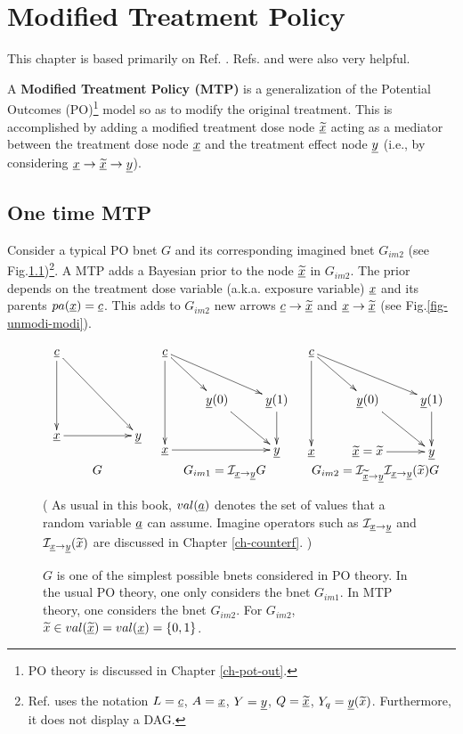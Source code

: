 \chapter{Modified Treatment Policy}
\label{ch-modi-treat}

This chapter is based
primarily on Ref. \cite{han-rot-2013}.
Refs.
\cite{hernan-book}
and \cite{khstats-mtp}
were also very helpful.


A {\bf Modified Treatment Policy (MTP)}
is a generalization
of the Potential
Outcomes (PO)\footnote{PO theory
is discussed in Chapter
 \ref{ch-pot-out}.} model
so as to
modify the original treatment.
This is accomplished
by adding a modified treatment
dose node $\ul{\tilx}$
acting as a mediator
between the treatment dose node 
$\rvx$ and the treatment effect node $\rvy$ (i.e., by considering
$\rvx\rarrow\ul{\tilx}\rarrow \rvy$).

\section{One time MTP}
Consider a typical PO bnet $G$
and its corresponding imagined bnet $G_{im2}$ (see Fig.\ref{fig-modi-po})\footnote{ Ref.\cite{han-rot-2013} uses the
notation $L = \rvc$,
$A = \rvx$, $Y=\rvy$, $Q=\ul{\tilx}$,
$Y_q=\rvy(\tilx)$. Furthermore, it does not 
display a DAG.
}.
A MTP adds a Bayesian prior to the
 node $\ul{\tilx}$ in $G_{im2}$.
The prior depends on the treatment
dose variable (a.k.a. exposure variable) $\rvx$ and its parents $pa(\rvx)=\rvc$.
This adds 
to $G_{im2}$  new arrows $\rvc\rarrow\ul{\tilx}$
and $\rvx\rarrow \ul{\tilx}$ (see Fig.\ref{fig-unmodi-modi}).


\begin{figure}[h!]
$$
\begin{array}{ccc}
\xymatrix{
\rvc
\ar[dd]\ar[ddrr]
\\
\\
\rvx \ar[rr]
&
&\rvy
}
&
\xymatrix{
\rvc
\ar[dd]\ar[dr] \ar[drr]
\\
& \rvy(0)\ar[dr]
&\rvy(1)\ar[d]
\\
\rvx\ar[rr]
&
&\rvy
}
&
\xymatrix{
\rvc
\ar[dd]\ar[dr] \ar[drr]
\\
& \rvy(0)\ar[dr]
&\rvy(1)\ar[d]
\\
\rvx
&\ul{\tilx}=\tilx\ar[r]
&\rvy
}
\\
G
&G_{im1} =\cali_{\rvx\rarrow\rvy} G
& G_{im2}=\cali_{\ul{\tilx}\rarrow\rvy}\cali_{\rvx\rarrow\rvy}(\tilx)G
\end{array}
$$
\caption{$G$ is one of the
simplest possible bnets considered in  PO theory.
In the usual PO theory,
one only considers the bnet $G_{im1}$.
In MTP theory, one
considers the bnet $G_{im2}$.
For $G_{im2}$, $\tilx\in val(\ul{\tilx})=
val(\rvx)=\bool$.} (
As usual in this book, $val(\rva)$
denotes the set of
values that a random variable
$\rva$ can assume.
Imagine operators such as
$\cali_{\rvx\rarrow \rvy}$
and $\cali_{\rvx\rarrow \rvy}(\tilx)$ 
are discussed in Chapter \ref{ch-counterf}.
)
\label{fig-modi-po}
\end{figure}


